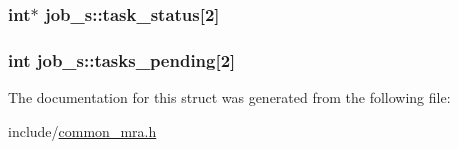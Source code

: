 \hypertarget{structjob__s_a25c05f7bc2c55b8626a947c42fbea207}{
\subsubsection[{task\-\_\-status}]{\setlength{\rightskip}{0pt plus 5cm}int$\ast$ {\bf job\-\_\-s\-::task\-\_\-status}\mbox{[}2\mbox{]}}}\label{structjob__s_a25c05f7bc2c55b8626a947c42fbea207}
\hypertarget{structjob__s_a2121f93a58679fe228efdefe7bdcd1ba}{
\subsubsection[{tasks\-\_\-pending}]{\setlength{\rightskip}{0pt plus 5cm}int {\bf job\-\_\-s\-::tasks\-\_\-pending}\mbox{[}2\mbox{]}}}\label{structjob__s_a2121f93a58679fe228efdefe7bdcd1ba}


\-The documentation for this struct was generated from the following file\-:\begin{DoxyCompactItemize}
\item 
include/\hyperlink{common__mra_8h}{common\-\_\-mra.\-h}\end{DoxyCompactItemize}
